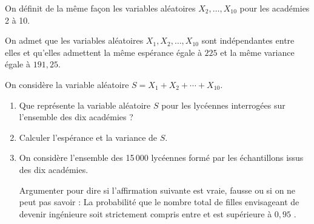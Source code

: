 On définit de la même façon les variables aléatoires $X_2, \dots, X_{10}$ pour les académies 2 à 10.

On admet que les variables aléatoires $X_1, X_2, \dots, X_{10}$ sont indépendantes entre elles et qu'elles admettent la même espérance égale à $225$ et la même variance égale à $191{,}25$.

On considère la variable aléatoire $S = X_1 + X_2 + \cdots + X_{10}$.

\medskip

\begin{enumerate}
\item Que représente la variable aléatoire $S$ pour les  lycéennes interrogées sur l'ensemble des dix académies ?
\item Calculer l'espérance et la variance de $S$.
\item On considère l'ensemble des 15\,000 lycéennes formé par les échantillons issus des dix académies.

Argumenter pour dire si l'affirmation suivante est vraie, fausse ou si on ne peut pas savoir : \og La probabilité que le nombre total de filles envisageant de devenir ingénieure soit strictement compris entre  et  est supérieure à $0{,}95$ \fg.
\end{enumerate}

\bigskip
